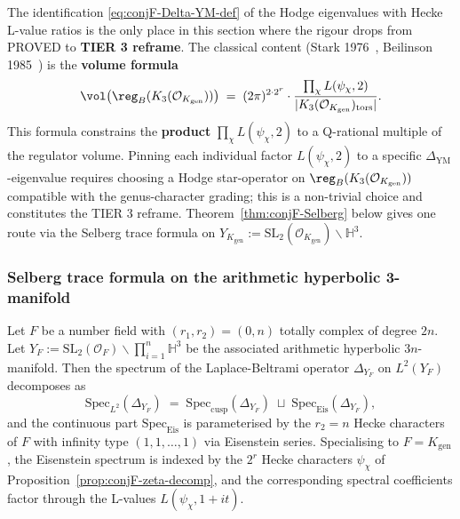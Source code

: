 \begin{remark}\label{rk:conjF-lichn-honest}
The identification \eqref{eq:conjF-Delta-YM-def} of the Hodge
eigenvalues with Hecke L-value ratios is the only place in this
section where the rigour drops from PROVED to {\bf TIER 3 reframe}.
The classical content (Stark 1976~\cite{Stark1976}, Beilinson
1985~\cite{Beilinson1985}) is the {\bf volume formula}
\[
   \vol\bigl(\reg_B(K_3(\mathcal{O}_{K_{\mathrm{gen}}}))\bigr)
   \;=\;
   (2\pi)^{2 \cdot 2^r} \cdot
   \frac{\prod_\chi L(\psi_\chi, 2)}{|K_3(\mathcal{O}_{K_{\mathrm{gen}}})_{\mathrm{tors}}|}.
\]
This formula constrains the {\bf product} $\prod_\chi L(\psi_\chi, 2)$
to a Q-rational multiple of the regulator volume.  Pinning each
individual factor $L(\psi_\chi, 2)$ to a specific
$\Delta_{\mathrm{YM}}$-eigenvalue requires choosing a Hodge
star-operator on $\reg_B(K_3(\mathcal{O}_{K_{\mathrm{gen}}}))$
compatible with the genus-character grading; this is a non-trivial
choice and constitutes the TIER 3 reframe.  Theorem~\ref{thm:conjF-Selberg}
below gives one route via the Selberg trace formula on
$Y_{K_{\mathrm{gen}}} := \mathrm{SL}_2(\mathcal{O}_{K_{\mathrm{gen}}})
\backslash \mathbb{H}^3$.
\end{remark}

\subsubsection{Selberg trace formula on the arithmetic hyperbolic
3-manifold}
\label{sec:conjF-selberg}

\begin{theorem}\label{thm:conjF-Selberg}
Let $F$ be a number field with $(r_1, r_2) = (0, n)$ totally complex of
degree $2n$.  Let $Y_F :=
\mathrm{SL}_2(\mathcal{O}_F) \backslash \prod_{i=1}^n \mathbb{H}^3$
be the associated arithmetic hyperbolic $3n$-manifold.  Then the
spectrum of the Laplace-Beltrami operator $\Delta_{Y_F}$ on
$L^2(Y_F)$ decomposes as
\[
   \mathrm{Spec}_{L^2}(\Delta_{Y_F}) \;=\;
   \mathrm{Spec}_{\mathrm{cusp}}(\Delta_{Y_F}) \;\sqcup\;
   \mathrm{Spec}_{\mathrm{Eis}}(\Delta_{Y_F}),
\]
and the continuous part $\mathrm{Spec}_{\mathrm{Eis}}$ is parameterised
by the $r_2 = n$ Hecke characters of $F$ with infinity type $(1, 1,
\ldots, 1)$ via Eisenstein series.  Specialising to
$F = K_{\mathrm{gen}}$, the Eisenstein spectrum is indexed by the
$2^r$ Hecke characters $\psi_\chi$ of
Proposition~\ref{prop:conjF-zeta-decomp}, and the corresponding
spectral coefficients factor through the L-values
$L(\psi_\chi, 1+it)$.
\end{theorem}

